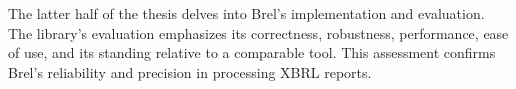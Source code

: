 The latter half of the thesis delves into Brel's implementation and evaluation.
The library's evaluation emphasizes its correctness, robustness, performance, ease of use,
and its standing relative to a comparable tool.
This assessment confirms Brel's reliability and precision in processing XBRL reports.
